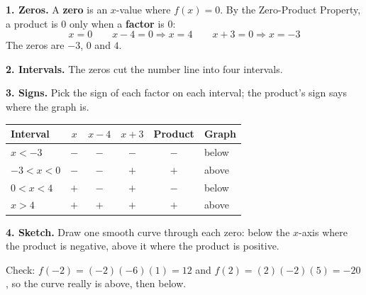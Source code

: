 \begin{minipage}[t]{0.55\textwidth}
\vspace{0pt}
\textbf{1. Zeros.} A \textbf{zero} is an $x$-value where $f(x)=0$. By the Zero-Product Property, a product is 0 only when a \textbf{factor} is 0:
\[x=0 \qquad x-4=0\Rightarrow x=4 \qquad x+3=0\Rightarrow x=-3\]
The zeros are $-3$, $0$ and $4$.

\textbf{2. Intervals.} The zeros cut the number line into four intervals.

\begin{center}
\end{center}

\textbf{3. Signs.} Pick the sign of each factor on each interval; the product's sign says where the graph is.

\small
\begin{tabular}{|l|c|c|c|c|l|}
\hline
\textbf{Interval} & $x$ & $x-4$ & $x+3$ & \textbf{Product} & \textbf{Graph} \\ \hline
$x<-3$ & $-$ & $-$ & $-$ & $-$ & below \\
$-3<x<0$ & $-$ & $-$ & $+$ & $+$ & above \\
$0<x<4$ & $+$ & $-$ & $+$ & $-$ & below \\
$x>4$ & $+$ & $+$ & $+$ & $+$ & above \\ \hline
\end{tabular}
\normalsize
\end{minipage}\hfill
\begin{minipage}[t]{0.42\textwidth}
\vspace{0pt}
\textbf{4. Sketch.} Draw one smooth curve through each zero: below the $x$-axis where the product is negative, above it where the product is positive.

\begin{center}
\end{center}
\small Check: $f(-2)=(-2)(-6)(1)=12$ and $f(2)=(2)(-2)(5)=-20$, so the curve really is above, then below.
\end{minipage}

